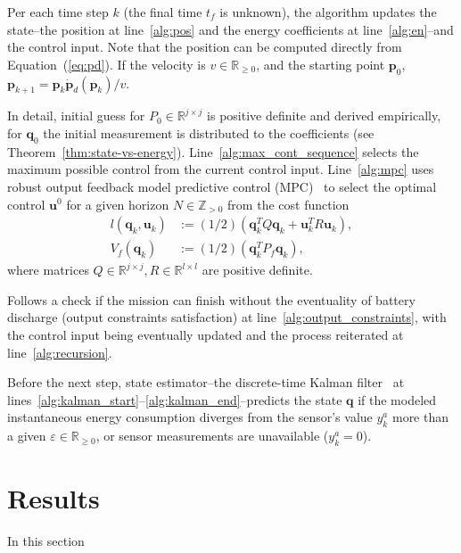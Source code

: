 \documentclass[letterpaper,10pt,conference]{ieeeconf}
\theoremstyle{definition}
\begin{document}
Per each time step $k$ (the final time $t_f$ is unknown), the algorithm updates the state--the position at line~\ref{alg:pos} and the energy coefficients at line~\ref{alg:en}--and the control input. Note that the position can be computed directly from Equation~(\ref{eq:pd}). If the velocity is $v\in\mathbb{R}_{\geq 0}$, and the starting point $\mathbf{p}_0$, $\mathbf{p}_{k+1}=\mathbf{p}_k\dot{\mathbf{p}}_d(\mathbf{p}_k)/v$.
  
In detail, initial guess for $P_0\in\mathbb{R}^{j\times j}$ is positive definite and derived empirically, for $\mathbf{q}_0$ the initial measurement is distributed to the coefficients (see Theorem~\ref{thm:state-vs-energy}). Line~\ref{alg:max_cont_sequence} selects the maximum possible control from the current control input. Line~\ref{alg:mpc} uses robust output feedback model predictive control (MPC)~\cite{rawlings2017model} to select the optimal control $\mathbf{u}^0$ for a given horizon $N\in\mathbb{Z}_{>0}$ from the cost function
\begin{equation}\begin{split}
  l(\mathbf{q}_k,\mathbf{u}_k)&:=(1/2)(\mathbf{q}_k^TQ\mathbf{q}_k+\mathbf{u}_k^TR\mathbf{u}_k),\\
  V_f(\mathbf{q}_k)&:=(1/2)(\mathbf{q}_k^TP_f\mathbf{q}_k),
\end{split}\end{equation}
where matrices $Q\in\mathbb{R}^{j\times j},R\in\mathbb{R}^{l\times l}$ are positive definite.

Follows a check if the mission can finish without the eventuality of battery discharge (output constraints satisfaction) at line~\ref{alg:output_constraints}, with the control input being eventually updated and the process reiterated at line~\ref{alg:recursion}.

Before the next step, state estimator--the discrete-time Kalman filter~\cite{simon2006optimal} at lines~\ref{alg:kalman_start}--\ref{alg:kalman_end}--predicts the state $\mathbf{q}$ if the modeled instantaneous energy consumption diverges from the sensor's value $y_k^a$ more than a given $\varepsilon\in\mathbb{R}_{\geq  0}$, or sensor measurements are unavailable ($y_k^a=0$).


\section{Results}
\label{sec:experimental}

In this section
\end{document}
